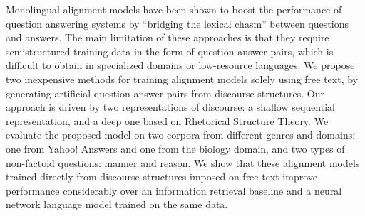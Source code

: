 Monolingual alignment models have been shown to boost the performance of question answering systems by ``bridging the lexical chasm'' between questions and answers. The main limitation of these approaches is that they require semistructured training data in the form of question-answer pairs, which is difficult to obtain in specialized domains or low-resource languages. We propose two inexpensive methods for training alignment models solely using free text, by generating artificial question-answer pairs from discourse structures. Our approach is driven by two representations of discourse: a shallow sequential representation, and a deep one based on Rhetorical Structure Theory. We evaluate the proposed model on two corpora from different genres and domains: one from Yahoo! Answers and one from the biology domain, and two types of non-factoid questions: manner and reason. We show that these alignment models trained directly from discourse structures imposed on free text improve performance considerably over an information retrieval baseline and a neural network language model trained on the same data.
